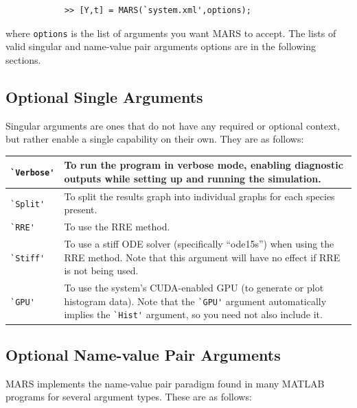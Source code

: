 \documentclass[ugrad,lot,lof,openright,11pt,oneside,onehalfspace]{RUthesis}
\begin{document}
		\begin{verbatim}
		    >> [Y,t] = MARS(`system.xml',options);
		\end{verbatim}

		\noindent
		where \verb|options| is the list of arguments you want MARS to accept. The lists of valid singular and name-value pair arguments options are in the following sections.

		\subsection{Optional Single Arguments}

			Singular arguments are ones that do not have any required or optional context, but rather enable a single capability on their own. They are as follows:

			\begin{longtable}{|p{1.3in}|p{4.2in}|}
			    	\hline
			    		\verb|`Verbose'| & To run the program in verbose mode, enabling diagnostic outputs while setting up and running the simulation.
			    		\\ \hline
			    		\verb|`Split'| & To split the results graph into individual graphs for each species present.
			    		\\ \hline
			    		\verb|`RRE'| & To use the RRE method.
			    		\\ \hline
			    		\verb|`Stiff'| & To use a stiff ODE solver (specifically ``ode15s'') when using the RRE method. Note that this argument will have no effect if RRE is not being used.
			    		\\ \hline
			    		\verb|`GPU'| & To use the system's CUDA-enabled GPU (to generate or plot histogram data). Note that the \verb|`GPU'| argument automatically implies the \verb|`Hist'| argument, so you need not also include it.
			    		\\ \hline
			\end{longtable}


		\subsection{Optional Name-value Pair Arguments}

			MARS implements the name-value pair paradigm found in many MATLAB programs for several argument types. These are as follows:
\end{document}
